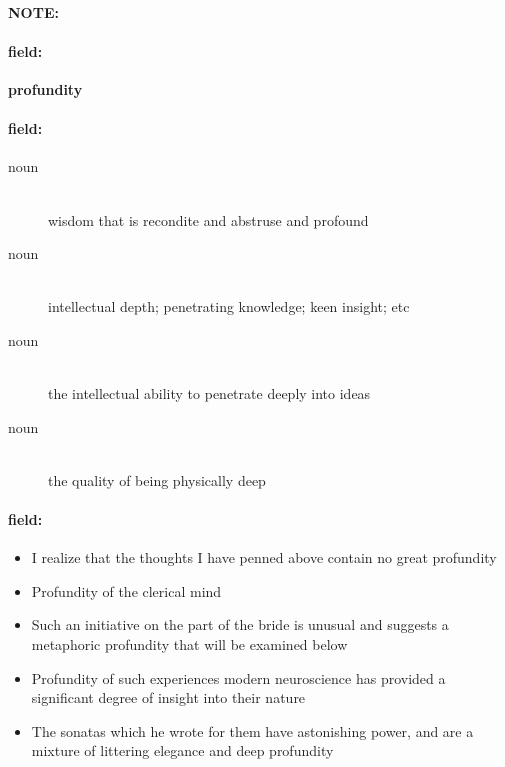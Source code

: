 \documentclass[12pt]{article}
\newenvironment{note}{\paragraph{NOTE:}}{}
\newenvironment{field}{\paragraph{field:}}{}
\begin{document}
\begin{note}
\begin{field}
\textbf{\large profundity}
\end{field}


\begin{field}
\begin{description}
\item[noun] \hfill \\ 
wisdom that is recondite and abstruse and profound

\item[noun] \hfill \\ 
intellectual depth; penetrating knowledge; keen insight; etc

\item[noun] \hfill \\ 
the intellectual ability to penetrate deeply into ideas

\item[noun] \hfill \\ 
the quality of being physically deep

\end{description}
\end{field}

\begin{field}
\begin{itemize}
\item I realize that the thoughts I have penned above contain no great profundity
\item Profundity of the clerical mind
\item Such an initiative on the part of the bride is unusual and suggests a metaphoric profundity that will be examined below
\item Profundity of such experiences modern neuroscience has provided a significant degree of insight into their nature
\item The sonatas which he wrote for them have astonishing power, and are a mixture of littering elegance and deep profundity
\end{itemize}
\end{field}
\end{note}
\end{document}

